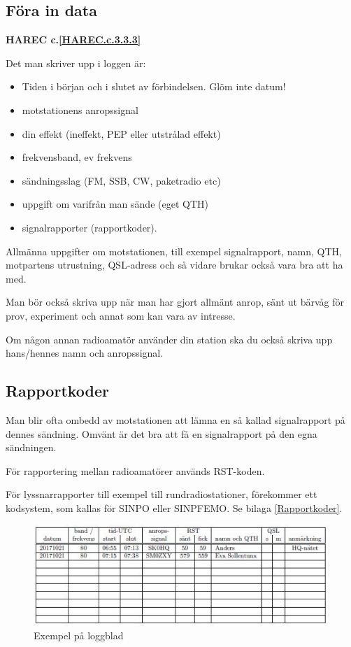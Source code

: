 \subsection{Föra in data}
\textbf{HAREC
  c.\ref{HAREC.c.3.3.3}\label{myHAREC.c.3.3.3}
}

Det man skriver upp i loggen är:
\begin{itemize}
  \item Tiden i början och i slutet av förbindelsen. Glöm inte datum!
  \item motstationens anropssignal
  \item din effekt (ineffekt, PEP eller utstrålad effekt)
  \item frekvensband, ev frekvens
  \item sändningsslag (FM, SSB, CW, paketradio etc)
  \item uppgift om varifrån man sände (eget QTH)
  \item signalrapporter (rapportkoder).
\end{itemize}

Allmänna uppgifter om motstationen, till exempel signalrapport, namn, QTH,
motpartens utrustning, QSL-adress och så vidare brukar också vara bra att ha med.

Man bör också skriva upp när man har gjort allmänt anrop, sänt ut
bärvåg för prov, experiment och annat som kan vara av intresse.

Om någon annan radioamatör använder din station ska du också skriva
upp hans/hennes namn och anropssignal.

\subsection{Rapportkoder}

Man blir ofta ombedd av motstationen att lämna en så kallad signalrapport på
dennes sändning.
Omvänt är det bra att få en signalrapport på den egna sändningen.

För rapportering mellan radioamatörer används RST-koden.

För lyssnarrapporter till exempel till rundradiostationer, förekommer ett
kodsystem, som kallas för SINPO eller SINPFEMO. Se bilaga \ref{Rapportkoder}.

\begin{figure}[ht]
  \includegraphics[width=\textwidth]{images/cropped_pdfs/bild_15_1-01.pdf}
  \caption{Exempel på loggblad}
  \label{loggblad}
\end{figure}
